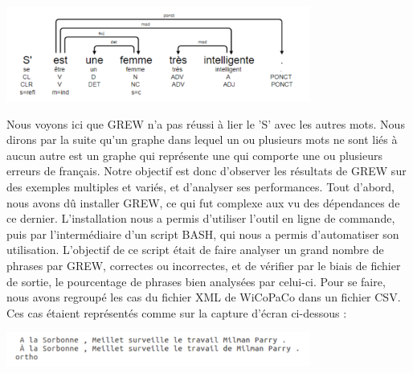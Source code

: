 \documentclass{article}
\begin{document}
\begin{center}
\includegraphics[width=10cm]{imgGrew.png} %
\end{center}

Nous voyons ici que GREW n'a pas r\'{e}ussi \`{a} lier le 'S' avec les autres mots. Nous dirons par la suite qu'un graphe dans lequel un ou plusieurs mots ne sont li\'{e}s \`{a} aucun autre est un graphe qui repr\'{e}sente une qui comporte une ou plusieurs erreurs de fran\c{c}ais. Notre objectif est donc d'observer  les r\'{e}sultats de GREW sur des exemples multiples et vari\'{e}s, et d'analyser ses performances.
\newline
\newline
Tout d'abord, nous avons d\^{u} installer GREW, ce qui fut complexe aux vu des d\'{e}pendances de ce dernier. L'installation nous a permis d'utiliser l'outil en ligne de commande, puis par l'interm\'{e}diaire d'un script BASH, qui nous a permis d'automatiser son utilisation. L'objectif de ce script \'{e}tait de faire analyser un grand nombre de phrases par GREW, correctes ou incorrectes, et de v\'{e}rifier par le biais de fichier de sortie, le pourcentage de phrases bien analys\'{e}es par celui-ci. Pour se faire, nous avons regroup\'{e} les cas du fichier XML de WiCoPaCo dans un fichier CSV. Ces cas \'{e}taient repr\'{e}sent\'{e}s comme sur la capture d'\'{e}cran ci-dessous :

\begin{center}
\includegraphics[width=10cm]{exemple1.png} %
\end{center}
\end{document}
